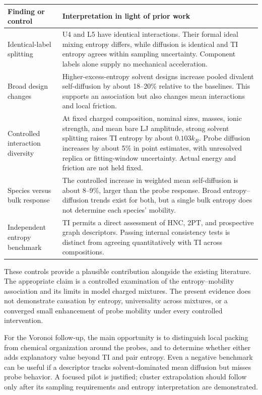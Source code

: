 \documentclass[11pt,a4paper]{article}
\begin{document}
\begin{longtable}{@{}p{}p{}@{}}
\toprule
Finding or control & Interpretation in light of prior work\\
\midrule
\endhead
Identical-label splitting & U4 and L5 have identical interactions. Their
formal ideal mixing entropy differs, while diffusion is identical and TI
entropy agrees within sampling uncertainty. Component labels alone supply
no mechanical acceleration.\\[3pt]
Broad design changes & Higher-excess-entropy solvent designs increase pooled
divalent self-diffusion by about 18--20\% relative to the baselines. This
supports an association but also changes mean interactions and local friction.\\[3pt]
Controlled interaction diversity & At fixed charged composition, nominal
sizes, masses, ionic strength, and mean bare LJ amplitude, strong solvent
splitting raises TI entropy by about $0.103k_B$. Probe diffusion increases
by about 5\% in point estimates, with unresolved replica or fitting-window
uncertainty. Actual energy and friction are not held fixed.\\[3pt]
Species versus bulk response & The controlled increase in weighted mean
self-diffusion is about 8--9\%, larger than the probe response. Broad
entropy--diffusion trends exist for both, but a single bulk entropy does
not determine each species' mobility.\\[3pt]
Independent entropy benchmark & TI permits a direct assessment of HNC,
2PT, and prospective graph descriptors. Passing internal consistency tests
is distinct from agreeing quantitatively with TI across compositions.\\
\bottomrule
\end{longtable}

These controls provide a plausible contribution alongside the existing
literature. The appropriate claim is a controlled examination of the
entropy--mobility association and its limits in model charged mixtures.
The present evidence does not demonstrate causation by entropy, universality
across mixtures, or a converged small enhancement of probe mobility under
every controlled intervention.

For the Voronoi follow-up, the main opportunity is to distinguish local
packing from chemical organization around the probes, and to determine
whether either adds explanatory value beyond TI and pair entropy. Even a
negative benchmark can be useful if a descriptor tracks solvent-dominated
mean diffusion but misses probe behavior. A focused pilot is justified;
cluster extrapolation should follow only after its sampling requirements
and entropy interpretation are demonstrated.
\end{document}
